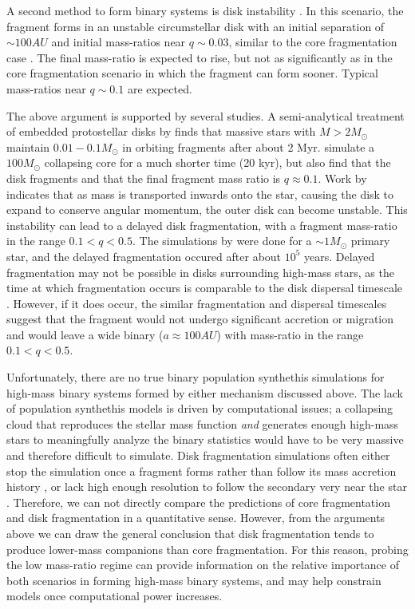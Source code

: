 \documentclass[11pt]{report}     %
\begin{document}
A second method to form binary systems is disk instability
\citep[see e.g.][]{Kratter2006, Stamatellos2011}. In
this scenario, the fragment forms in an unstable circumstellar disk
with an initial separation of $\sim 100 AU$ and initial mass-ratios
near $q \sim 0.03$, similar to the core fragmentation case
\citep{Kratter2006}. The final mass-ratio is expected to rise, but not
as significantly as in the core fragmentation scenario in which the
fragment can form sooner. Typical mass-ratios near $q \sim 0.1$ are expected.

The above argument is supported by several studies. A semi-analytical treatment of embedded protostellar disks by
\cite{Kratter2008} finds that massive stars with $M > 2M_{\odot}$ maintain $0.01 - 0.1
M_{\odot}$ in orbiting fragments after about 2 Myr. \cite{Krumholz2007}
simulate a $100 M_{\odot}$ collapsing core for a much shorter time (20 kyr),
but also find that the disk fragments and that the final fragment mass
ratio is $q \approx 0.1$. Work by \cite{Clarke2009} indicates that as
mass is transported inwards onto the star, causing the disk to expand to
conserve angular momentum, the outer disk can become unstable. This
instability can lead to a delayed disk fragmentation,
with a fragment mass-ratio in the range $0.1 < q <
0.5$. The simulations by \cite{Clarke2009} were done for a $\sim
1M_{\odot}$ primary star, and the delayed fragmentation occured after
about $10^5$ years. Delayed fragmentation may not be possible in disks surrounding
high-mass stars, as the time at which fragmentation occurs is
comparable to the disk dispersal timescale \citep{Klahr2006}. However,
if it does occur, the similar fragmentation and dispersal timescales suggest that the fragment
would not undergo significant accretion or migration and would leave a
wide binary ($a \approx 100 AU$) with mass-ratio in the range $0.1 < q <
0.5$.

Unfortunately, there are no true binary population synthethis
simulations for high-mass binary systems formed by either mechanism
discussed above. The lack of population synthethis models is driven
by computational issues; a collapsing
cloud that reproduces the stellar mass function \emph{and} generates
enough high-mass stars to meaningfully analyze the binary statistics
would have to be very massive and therefore difficult to
simulate. Disk fragmentation simulations often either stop the
simulation once a fragment forms rather than follow its mass accretion
history \citep[e.g.][]{Boss2011, Krumholz2007}, or lack high enough resolution to follow the secondary very
near the star \citep[e.g.][]{BonnellBate2005}. Therefore, we can not
directly compare the predictions of core fragmentation and disk fragmentation in a quantitative
sense. However, from the arguments above we can draw the general conclusion that disk
fragmentation tends to produce lower-mass companions than core
fragmentation. For this reason, probing the low mass-ratio regime can
provide information on the relative importance of both scenarios in
forming high-mass binary systems, and may help constrain models once
computational power increases.
\end{document}
